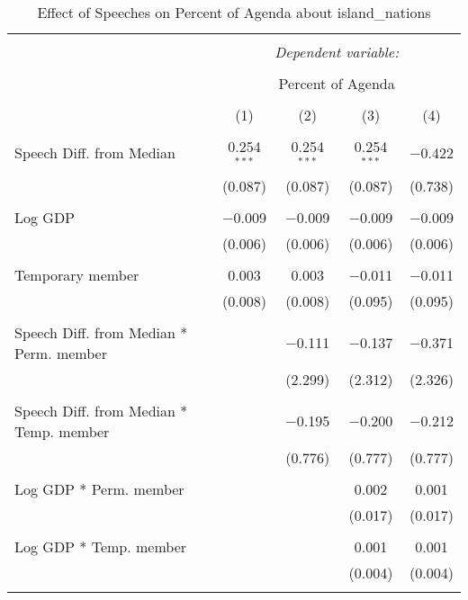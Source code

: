 
\begin{table}[!htbp] \centering 
  \caption{Effect of Speeches on Percent of Agenda about island_nations} 
  \label{} 
\begin{tabular}{@{\extracolsep{5pt}}lcccc} 
\\[-1.8ex]\hline 
\hline \\[-1.8ex] 
 & \multicolumn{4}{c}{\textit{Dependent variable:}} \\ 
\cline{2-5} 
\\[-1.8ex] & \multicolumn{4}{c}{Percent of Agenda} \\ 
\\[-1.8ex] & (1) & (2) & (3) & (4)\\ 
\hline \\[-1.8ex] 
 Speech Diff. from Median & 0.254$^{***}$ & 0.254$^{***}$ & 0.254$^{***}$ & $-$0.422 \\ 
  & (0.087) & (0.087) & (0.087) & (0.738) \\ 
  & & & & \\ 
 Log GDP & $-$0.009 & $-$0.009 & $-$0.009 & $-$0.009 \\ 
  & (0.006) & (0.006) & (0.006) & (0.006) \\ 
  & & & & \\ 
 Temporary member & 0.003 & 0.003 & $-$0.011 & $-$0.011 \\ 
  & (0.008) & (0.008) & (0.095) & (0.095) \\ 
  & & & & \\ 
 Speech Diff. from Median * Perm. member &  & $-$0.111 & $-$0.137 & $-$0.371 \\ 
  &  & (2.299) & (2.312) & (2.326) \\ 
  & & & & \\ 
 Speech Diff. from Median * Temp. member &  & $-$0.195 & $-$0.200 & $-$0.212 \\ 
  &  & (0.776) & (0.777) & (0.777) \\ 
  & & & & \\ 
 Log GDP * Perm. member &  &  & 0.002 & 0.001 \\ 
  &  &  & (0.017) & (0.017) \\ 
  & & & & \\ 
 Log GDP * Temp. member &  &  & 0.001 & 0.001 \\ 
  &  &  & (0.004) & (0.004) \\ 
  & & & & \\ 

\end{tabular}
\end{table}
